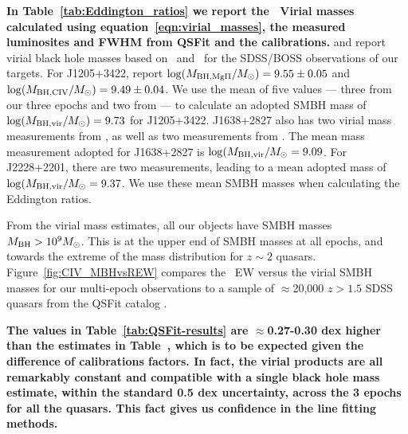 \documentclass[fleqn,usenatbib]{mnras}
\begin{document}
{\bf In Table~\ref{tab:Eddington_ratios} we report the \civ\ Virial masses 
calculated using equation~\ref{eqn:virial_masses}, the measured luminosites
and FWHM from QSFit and the \citet{VestergaardPeterson2006} calibrations.
}
\citet{Shen2011} and \citet{Kozlowski2017} report virial black hole
masses based on \mgii\ and \civ\ for the SDSS/BOSS observations of our
targets. For J1205+3422, \citet{Shen2011} report $\log (M_{\rm BH,
MgII}/M_{\odot}) = 9.55 \pm 0.05$ and $\log(M_{\rm BH, CIV}/M_{\odot})
= 9.49 \pm 0.04$. We use the mean of five values --- three from our
three epochs and two from \citet{Shen2011} --- to calculate an adopted
SMBH mass of $\log (M_{\rm BH, vir}/M_{\odot}) = 9.73$ for J1205+3422.
J1638+2827 also has two virial mass measurements from
\citet{Shen2011}, as well as two measurements from
\citet{Kozlowski2017}. The mean mass measurement adopted for
J1638+2827 is $\log(M_{\rm BH, vir}/M_{\odot} = 9.09$. For J2228+2201,
there are two \citet{Kozlowski2017} measurements, leading to a mean
adopted mass of $\log(M_{\rm BH, vir}/M_{\odot} = 9.37$. We use these
mean SMBH masses when calculating the Eddington ratios.

From the virial mass estimates, all our objects have SMBH masses
$M_{\rm BH} >10^{9} M_{\odot}$.  This is at the upper end of SMBH
masses at all epochs, and towards the extreme of the mass distribution
for $z\sim2$ quasars.  Figure~\ref{fig:CIV_MBHvsREW} compares the
\civ\ EW versus the virial SMBH masses for our multi-epoch
observations to a sample of $\approx$20,000 $z>1.5$ SDSS quasars from
the QSFit catalog \citep{Calderone2017}. 

{\bf The values in Table~\ref{tab:QSFit-results} are
$\approx$0.27-0.30 dex higher than the estimates in
Table~\label{tab:Eddington_ratios}, which is to be expected given the
difference of calibrations factors. In fact, the virial products are
all remarkably constant and compatible with a single black hole mass
estimate, within the standard 0.5 dex uncertainty, across the 3 epochs
for all the quasars.  This fact gives us confidence in the line
fitting methods.}
\end{document}
